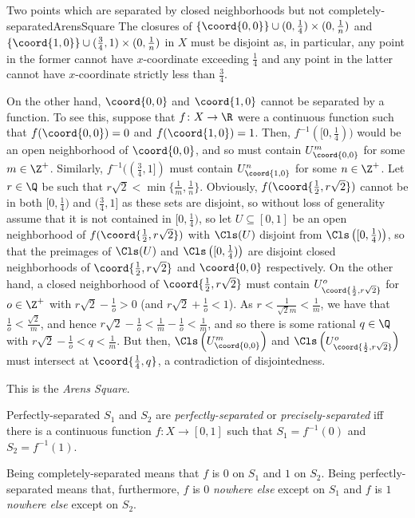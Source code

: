 \begin{exm}{Two points which are separated by closed neighborhoods but not completely-separated}{ArensSquare}
The closures of $\{ \coord{0,0}\} \cup (0,\frac{1}{4})\times (0,\frac{1}{n})$ and $\{ \coord{1,0}\} \cup (\frac{3}{4},1)\times (0,\frac{1}{n})$ in $X$ must be disjoint as, in particular, any point in the former cannot have $x$-coordinate exceeding $\frac{1}{4}$ and any point in the latter cannot have $x$-coordinate strictly less than $\frac{3}{4}$.

On the other hand, $\coord{0,0}$ and $\coord{1,0}$ cannot be separated by a function.  To see this, suppose that $f\colon X\rightarrow \R$ were a continuous function such that $f(\coord{0,0})=0$ and $f(\coord{1,0})=1$.  Then, $f^{-1}([0,\frac{1}{4}))$ would be an open neighborhood of $\coord{0,0}$, and so must contain $U_{\coord{0,0}}^m$ for some $m\in \Z ^+$.  Similarly, $f^{-1}((\frac{3}{4},1])$ must contain $U_{\coord{1,0}}^n$ for some $n\in \Z ^+$.  Let $r\in \Q$ be such that $r\sqrt{2}<\min \{ \frac{1}{m},\frac{1}{n}\}$.  Obviously, $f(\coord{\frac{1}{2},r\sqrt{2}})$ cannot be in both $[0,\frac{1}{4})$ and $(\frac{3}{4},1]$ as these sets are disjoint, so without loss of generality assume that it is not contained in $[0,\frac{1}{4})$, so let $U \subseteq [0,1]$ be an open neighborhood of $f(\coord{\frac{1}{2},r\sqrt{2}})$ with $\Cls (U)$ disjoint from $\Cls \left( [0,\frac{1}{4})\right) $, so that the preimages of $\Cls (U)$ and $\Cls \left( [0,\frac{1}{4})\right)$ are disjoint closed neighborhoods of $\coord{\frac{1}{2},r\sqrt{2}}$ and $\coord{0,0}$ respectively.  On the other hand, a closed neighborhood of $\coord{\frac{1}{2},r\sqrt{2}}$ must contain $U_{\coord{\frac{1}{2},r\sqrt{2}}}^o$ for $o\in \Z ^+$ with $r\sqrt{2}-\frac{1}{o}>0$ (and $r\sqrt{2}+\frac{1}{o}<1$).  As $r<\frac{1}{\sqrt{2}m}<\frac{1}{m}$, we have that $\frac{1}{o}<\frac{\sqrt{2}}{m}$, and hence $r\sqrt{2}-\frac{1}{o}<\frac{1}{m}-\frac{1}{o}<\frac{1}{m}$, and so there is some rational $q\in \Q$ with $r\sqrt{2}-\frac{1}{o}<q<\frac{1}{m}$.  But then, $\Cls \left( U_{\coord{0,0}}^m\right)$ and $\Cls \left( U_{\coord{\frac{1}{2},r\sqrt{2}}}^o\right)$ must intersect at $\coord{\frac{1}{4},q}$,  a contradiction of disjointedness.
\begin{rmk}
This is the \emph{Arens Square}.
\end{rmk}
\end{exm}
\begin{dfn}{Perfectly-separated}{}
$S_1$ and $S_2$ are \emph{perfectly-separated} or \emph{precisely-separated} iff there is a continuous function $f\colon X\rightarrow [0,1]$ such that $S_1=f^{-1}(0)$ and $S_2=f^{-1}(1)$.
\begin{rmk}
Being completely-separated means that $f$ is $0$ on $S_1$ and $1$ on $S_2$.  Being perfectly-separated means that, furthermore, $f$ is $0$ \emph{nowhere else} except on $S_1$ and $f$ is $1$ \emph{nowhere else} except on $S_2$.
\end{rmk}
\end{dfn}
